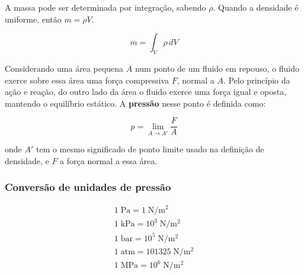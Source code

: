 A massa pode ser determinada por integração, sabendo $\rho$. Quando a densidade é uniforme, então $m = \rho V$.

\begin{equation}
    m = \int_{V} \rho \, dV
\end{equation}

Considerando uma área pequena \( A \) num ponto de um fluido em repouso, o fluido exerce sobre essa área uma força compressiva \( F \), normal a \( A \). Pelo princípio da ação e reação, do outro lado da área o fluido exerce uma força igual e oposta, mantendo o equilíbrio estático.
A \textbf{pressão} nesse ponto é definida como:

\begin{equation}
    p = \lim_{A \to A'} \frac{F}{A}
\end{equation}

onde $A'$ tem o mesmo significado de ponto limite usado na definição de densidade, e $F$ a força normal a essa área.

\subsubsection{Conversão de unidades de pressão}

\begin{eqnarray*}
    1 \; \text{Pa} = 1 \; \text{N}/\text{m}^2       \\
    1 \; \text{kPa} = 10^3 \; \text{N}/\text{m}^2   \\
    1 \; \text{bar} = 10^5 \; \text{N}/\text{m}^2   \\
    1 \; \text{atm} = 101325 \; \text{N}/\text{m}^2 \\
    1 \; \text{MPa} = 10^6 \; \text{N}/\text{m}^2   
\end{eqnarray*}